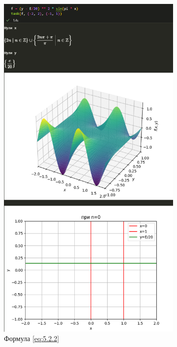 \documentclass[14pt,a4paper]{extarticle}
\begin{document}
\begin{figure}
    [ht!]\centering
    \begin{subfigure}{0.48\linewidth}
        \includegraphics[width=0.95\linewidth]{figures/5.2/1.2.png}
        \caption{Формула \ref{eq:5.2.2}}
        \label{pic:5.2.2}
    \end{subfigure}
    \begin{subfigure}{0.48\linewidth}

\end{subfigure}
\end{figure}
\end{document}

